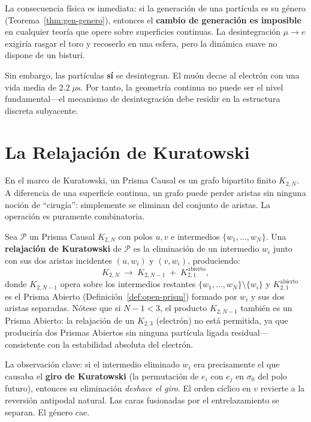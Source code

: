 \documentclass[11pt, a4paper, openany]{book}
\begin{document}
La consecuencia física es inmediata: si la generación de una partícula
es su género (Teorema~\ref{thm:gen-genero}), entonces el \textbf{cambio
de generación es imposible} en cualquier teoría que opere sobre
superficies continuas. La desintegración $\mu \to e$ exigiría rasgar el
toro y recoserlo en una esfera, pero la dinámica suave no dispone de un
bisturí.

Sin embargo, las partículas \textbf{sí} se desintegran. El muón decae
al electrón con una vida media de $2.2\;\mu\text{s}$. Por tanto, la
geometría continua no puede ser el nivel fundamental---el mecanismo de
desintegración debe residir en la estructura discreta subyacente.

\section{La Relajación de Kuratowski}
\label{sec:relajacion}

En el marco de Kuratowski, un Prisma Causal es un grafo bipartito finito
$K_{2,N}$. A diferencia de una superficie continua, un grafo puede
perder aristas sin ninguna noción de ``cirugía'': simplemente se
eliminan del conjunto de aristas. La operación es puramente
combinatoria.

\begin{definition}
\label{def:relajacion}
Sea $\mathcal{P}$ un Prisma Causal $K_{2,N}$ con polos $u, v$ e
intermedios $\{w_1, \ldots, w_N\}$. Una \textbf{relajación de
Kuratowski} de $\mathcal{P}$ es la eliminación de un intermedio $w_i$
junto con sus dos aristas incidentes $(u, w_i)$ y $(v, w_i)$,
produciendo:
\[
  K_{2,N} \;\longrightarrow\; K_{2,N-1} \;+\; K_{2,1}^{\mathrm{abierto}},
\]
donde $K_{2,N-1}$ opera sobre los intermedios restantes
$\{w_1, \ldots, w_N\} \setminus \{w_i\}$ y
$K_{2,1}^{\mathrm{abierto}}$ es el Prisma Abierto
(Definici\'on~\ref{def:open-prism}) formado por $w_i$ y sus dos aristas
separadas. N\'otese que si $N - 1 < 3$, el producto $K_{2,N-1}$
tambi\'en es un Prisma Abierto: la relajaci\'on de un $K_{2,3}$
(electr\'on) no est\'a permitida, ya que producir\'ia dos Prismas
Abiertos sin ninguna part\'icula ligada residual---consistente con la
estabilidad absoluta del electr\'on.
\end{definition}

La observación clave: si el intermedio eliminado $w_i$ era precisamente
el que causaba el \textbf{giro de Kuratowski} (la permutación de $e_i$
con $e_j$ en $\sigma_0$ del polo futuro), entonces su eliminación
\emph{deshace el giro}. El orden cíclico en $v$ revierte a la
reversión antipodal natural. Las caras fusionadas por el entrelazamiento
se separan. El género cae.
\end{document}
